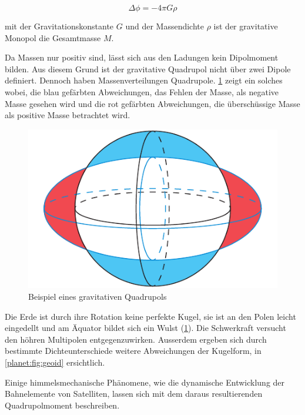 \begin{equation*}
    \Delta \phi = -4\pi G\rho
\end{equation*}

\noindent
mit der Gravitationskonstante \(G\) und der Massendichte \(\rho\) ist der gravitative Monopol die Gesamtmasse \(M\).

Da Massen nur positiv sind, lässt sich aus den Ladungen kein Dipolmoment bilden.
Aus diesem Grund ist der gravitative Quadrupol nicht über zwei Dipole definiert.
Dennoch haben Massenverteilungen Quadrupole.
\cref{planet:fig:quadroearth} zeigt ein solches wobei, die blau gefärbten Abweichungen, das Fehlen der Masse, als negative Masse gesehen wird und die rot gefärbten Abweichungen, die überschüssige Masse als positive Masse betrachtet wird.  

\begin{figure}[h]
    \centering
    \includegraphics[width=0.60\linewidth]{papers/planet/pictures/Quadroearth.pdf}
    \caption{Beispiel eines gravitativen Quadrupols
        \label{planet:fig:quadroearth}}
\end{figure}

\begin{beispiel}
    Die Erde ist durch ihre Rotation keine perfekte Kugel, sie ist an den Polen leicht eingedellt und am Äquator bildet sich ein Wulst (\cref{planet:fig:quadroearth}).
    Die Schwerkraft versucht den höhren Multipolen entgegenzuwirken.
    Ausserdem ergeben sich durch bestimmte Dichteunterschiede weitere Abweichungen der Kugelform, in \cref{planet:fig:geoid} ersichtlich.
\end{beispiel}

Einige himmelsmechanische Phänomene, wie die dynamische Entwicklung der Bahnelemente von Satelliten, lassen sich mit dem daraus resultierenden Quadrupolmoment beschreiben.
